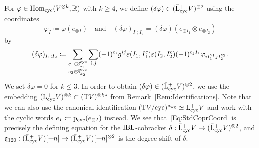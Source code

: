 \documentclass[\MainFolder/Text.tex]{subfiles}
\begin{document}
For $\varphi\in \mathrm{Hom}_{\mathrm{cyc}}(V^{\otimes k},\mathbb{R})$ with $k\ge 4$, we define $(\delta\varphi)\in(\bar{\mathrm{L}}^+_{\mathrm{cyc}} V)^{\otimes 2}$ using the coordinates
\begin{equation}\label{Eq:CoefCoord}
\varphi_{I} \coloneqq \varphi(e_{\otimes I})\quad\text{and}\quad (\delta\varphi)_{I_1;I_2} = (\delta\varphi)(e_{\otimes I_1} \otimes e_{\otimes I_2})
\end{equation}
by
\begin{equation}\label{Eq:StdCoprCoord}
(\delta\varphi)_{I_1;I_2} \coloneqq \sum_{\substack{c_1 \in\mathbb{S}^{\mathrm{cyc}}_{k_1} \\ c_2\in\mathbb{S}^{\mathrm{cyc}}_{k_2}}} \sum_{i,j} (-1)^{e_i}g^{ij} \varepsilon(I_1,I_1^c)\varepsilon(I_2,I_2^c)(-1)^{e_j I_1} \varphi_{i I_1^{c_1} j I_2^{c_2}}.
\end{equation}
We set $\delta \varphi = 0$ for $k\le 3$. In order to obtain $(\delta\varphi)\in(\bar{\mathrm{L}}^+_{\mathrm{cyc}} V)^{\otimes 2}$, we use the embedding $(\mathrm{L}^+_{\mathrm{cyc}} V)^{\otimes k} \subset (\mathrm{T} V)^{\otimes k*}$ from Remark~\ref{Rem:Identifications}. Note that we can also use the canonical identification $(\mathrm{T} V/\mathrm{cyc})^{*_{\mathrm{wg}}}\simeq \mathrm{L}^+_{\mathrm{cyc}} V$ and work with the cyclic words $e_I \coloneqq \mathrm{p}_{\mathrm{cyc}}(e_{\otimes I})$ instead. We see that~\eqref{Eq:StdCoprCoord} is precisely the defining equation \cite[Equation~(10.6)]{Cieliebak2015} for the $\mathrm{IBL}$-cobracket $\delta: \bar{\mathrm{L}}^+_{\mathrm{cyc}} V \rightarrow (\bar{\mathrm{L}}^+_{\mathrm{cyc}} V)^{\otimes 2}$, and $\mathfrak{q}_{120}:(\bar{\mathrm{L}}^+_{\mathrm{cyc}} V)[-n]\rightarrow(\bar{\mathrm{L}}^+_{\mathrm{cyc}} V)[-n]^{\otimes 2}$ is the degree shift of $\delta$.
\end{document}
